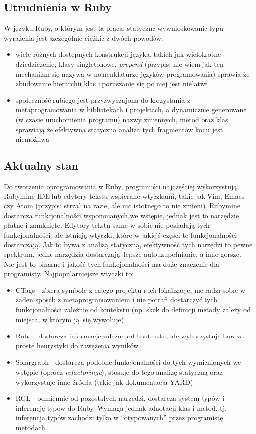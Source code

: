 \documentclass[declaration,shortabstract]{iithesis}
\begin{document}
\subsection{Utrudnienia w Ruby}

W języku Ruby, o którym jest ta praca, statyczne wywnioskowanie typu wyrażenia jest szczególnie ciężkie z dwóch powodów:
\begin{itemize}
\item wiele różnych dostępnych konstrukcji języka, takich jak wielokrotne dziedziczenie, klasy singletonowe, \textit{prepend} (przypis: nie wiem jak ten mechanizm się nazywa w nomenklaturze języków programowania) sprawia że zbudowanie hierarchii klas i poruszanie się po niej jest niełatwe
\item społeczność rubiego jest przyzwyczajona do korzystania z metaprogramowania w bibliotekach i projektach, a dynamicznie generowane (w czasie uruchomienia programu) nazwy zmiennych, metod oraz klas sprawiają że efektywna statyczna analiza tych fragmentów kodu jest niemożliwa
\end{itemize}

\subsection{Aktualny stan}

Do tworzenia oprogramowania w Ruby, programiści najczęściej wykorzystują Rubymine IDE lub edytory tekstu wspierane wtyczkami, takie jak Vim, Emacs czy Atom (przypis: strzał na razie, ale nic istotnego to nie zmieni).
Rubymine dostarcza funkcjonalności wspomnianych we wstępie, jednak jest to narzędzie płatne i zamknięte.
Edytory tekstu same w sobie nie posiadają tych funkcjonalności, ale istnieją wtyczki, które w jakiejś części te funkcjonalności dostarczają. Jak to bywa z analizą statyczną, efektywność tych narzędzi to pewne spektrum, jedne narzędzia dostarczają lepsze autouzupełnianie, a inne gorsze. Nie jest to binarne i jakość tych funkcjonalności ma duże znaczenie dla programisty.
Najpopularniejsze wtyczki to:
\begin{itemize}
\item CTags - zbiera symbole z całego projektu i ich lokalizacje, nie radzi sobie w żaden sposób z metaprogramowaniem i nie potrafi dostarczyć tych funkcjonalności zależnie od kontekstu (np. skok do definicji metody zależy od miejsca, w którym ją się wywołuje)
\item Robe - dostarcza informacje zależne od kontekstu, ale wykorzystuje bardzo proste heurystyki do zawężenia wyników
\item Solargraph - dostarcza podobne funkcjonalności do tych wymienionych we wstępie (oprócz \textit{refactoringu}), stosuje do tego analizę statyczną oraz wykorzystuje inne źródła (takie jak dokumentacja YARD)
\item RGL - odmiennie od pozostałych narzędzi, dostarcza system typów i inferencję typów do Ruby. Wymaga jednak adnotacji klas i metod, tj. inferencja typów zachodzi tylko w ``otypowanych'' przez programistę metodach.
\end{itemize}
\end{document}
